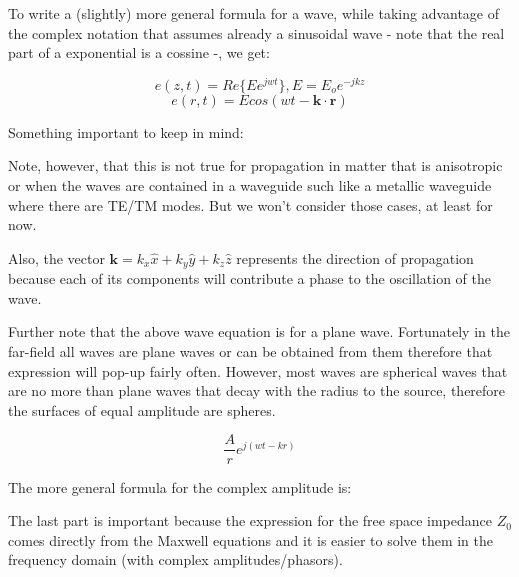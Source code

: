 To write a (slightly) more general formula for a wave, while taking advantage of the complex notation that assumes already a sinusoidal wave - note that the real part of a exponential is a cossine -, we get:

\begin{equation}
    e(z,t) = Re\{E e^{jwt}\}, E = E_o e^{-jkz}
\end{equation}
\begin{equation}
    e(r,t) = E  cos(wt - \boldsymbol{k} \cdot \boldsymbol{r})
\end{equation}


Something important to keep in mind:

\begin{center}
\end{center}


Note, however, that this is not true for propagation in matter that is anisotropic or when the waves are contained in a waveguide such like a metallic waveguide where there are TE/TM modes. But we won't consider those cases, at least for now.

Also, the vector $\boldsymbol{k}  = k_x \hat{x} + k_y \hat{y} + k_z \hat{z}$ represents the direction of propagation because each of its components will contribute a phase to the oscillation of the wave.

Further note that the above wave equation is for a plane wave. Fortunately in the far-field all waves are plane waves or can be obtained from them therefore that expression will pop-up fairly often. However, most waves are spherical waves that are no more than plane waves that decay with the radius to the source, therefore the surfaces of equal amplitude are spheres.

\begin{equation}
    \frac{A}{r} e^{j(wt-kr)}
\end{equation}

The more general formula for the complex amplitude is:


The last part is important because the expression for the free space impedance $Z_0$ comes directly from the Maxwell equations and it is easier to solve them in the frequency domain (with complex amplitudes/phasors).


